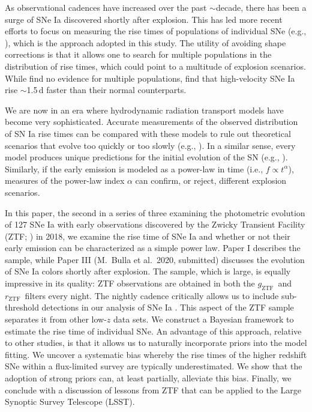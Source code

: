 \documentclass[twocolumn]{aastex63}
\newcommand{\rztf}{$r_\mathrm{ZTF}$}
\newcommand{\gztf}{$g_\mathrm{ZTF}$}
\begin{document}
As observational cadences have increased over the past $\sim$decade, there has
been a surge of SNe Ia discovered shortly after explosion. This has led more
recent efforts to focus on measuring the rise times of populations of
individual SNe (e.g., \citealt{Firth15,Zheng17a,Papadogiannakis19}), which is
the approach adopted in this study. The utility of avoiding shape corrections
is that it allows one to search for multiple populations in the distribution
of rise times, which could point to a multitude of explosion scenarios. While
\citet{Papadogiannakis19} find no evidence for multiple populations,
\citet{Ganeshalingam10} find that high-velocity SNe Ia rise $\sim$1.5\,d
faster than their normal counterparts.

We are now in an era where hydrodynamic radiation transport models have become
very sophisticated. Accurate measurements of the observed distribution of SN
Ia rise times can be compared with these models to rule out theoretical
scenarios that evolve too quickly or too slowly (e.g., \citealt{Magee18}). In
a similar sense, every model produces unique predictions for the initial
evolution of the SN (e.g., \citealt{Dessart14,Noebauer17,Polin19,Magee19}).
Similarly, if the early emission is modeled as a power-law in time (i.e., $f
\propto t^\alpha$), measures of the power-law index $\alpha$ can confirm, or
reject, different explosion scenarios.

In this paper, the second in a series of three examining the photometric
evolution of 127 SNe Ia with early observations discovered by the Zwicky
Transient Facility (ZTF; \citealt{Bellm19,Graham19}) in 2018, we examine the
rise time of SNe Ia and whether or not their early emission can be
characterized as a simple power law. Paper I \citep{Yao19} describes the
sample, while Paper III (M.~Bulla et al.\ 2020, submitted) discusses the
evolution of SNe Ia colors shortly after explosion. The sample, which is
large, is equally impressive in its quality: ZTF observations are obtained in
both the \gztf\ and \rztf\ filters every night. The nightly cadence critically
allows us to include sub-threshold detections in our analysis of SNe Ia
\citep{Yao19}. This aspect of the ZTF sample separates it from other low-$z$
data sets. We construct a Bayesian framework to estimate the rise time of
individual SNe. An advantage of this approach, relative to other studies, is
that it allows us to naturally incorporate priors into the model fitting. We
uncover a systematic bias whereby the rise times of the higher redshift SNe
within a flux-limited survey are typically underestimated. We show that the
adoption of strong priors can, at least partially, alleviate this bias.
Finally, we conclude with a discussion of lessons from ZTF that can be applied
to the Large Synoptic Survey Telescope (LSST).
\end{document}
